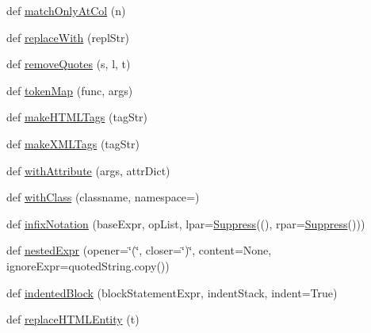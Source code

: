 \begin{DoxyCompactItemize}
\item 
def \hyperlink{namespacepyparsing_a561346d6568db7e83c52dc807f8c243d}{match\+Only\+At\+Col} (n)
\item 
def \hyperlink{namespacepyparsing_a495a53dce17529eb7ae084dfe3a0acc4}{replace\+With} (repl\+Str)
\item 
def \hyperlink{namespacepyparsing_a343049ca4aeee44db41864846afb2f9b}{remove\+Quotes} (s, l, t)
\item 
def \hyperlink{namespacepyparsing_a4f2b3f96efca0c41fda874a8f9389555}{token\+Map} (func, args)
\item 
def \hyperlink{namespacepyparsing_acd02ec882992514110dd9f188328d5be}{make\+H\+T\+M\+L\+Tags} (tag\+Str)
\item 
def \hyperlink{namespacepyparsing_a15935de52b21b1c342e0ed68e7bac2d6}{make\+X\+M\+L\+Tags} (tag\+Str)
\item 
def \hyperlink{namespacepyparsing_ada8651dcae5c5d931d803b9e9a63e1e9}{with\+Attribute} (args, attr\+Dict)
\item 
def \hyperlink{namespacepyparsing_a7e7ce66cc9889c783c6d086ffd29eec9}{with\+Class} (classname, namespace=\textquotesingle{}\textquotesingle{})
\item 
def \hyperlink{namespacepyparsing_acdf84dac66cbf76ba8850d88ce9556ed}{infix\+Notation} (base\+Expr, op\+List, lpar=\hyperlink{classpyparsing_1_1Suppress}{Suppress}(\textquotesingle{}(\textquotesingle{}), rpar=\hyperlink{classpyparsing_1_1Suppress}{Suppress}(\textquotesingle{})\textquotesingle{}))
\item 
def \hyperlink{namespacepyparsing_a9c52168a8f25a43675d7ee8d271332cb}{nested\+Expr} (opener=\char`\"{}(\char`\"{}, closer=\char`\"{})\char`\"{}, content=None, ignore\+Expr=quoted\+String.\+copy())
\item 
def \hyperlink{namespacepyparsing_ab8b1b70b5d1e96e7c4ac6c23d76f8a3a}{indented\+Block} (block\+Statement\+Expr, indent\+Stack, indent=True)
\item 
def \hyperlink{namespacepyparsing_a6bdc3e8bb15795f14ddf563e1ca764b3}{replace\+H\+T\+M\+L\+Entity} (t)
\end{DoxyCompactItemize}
